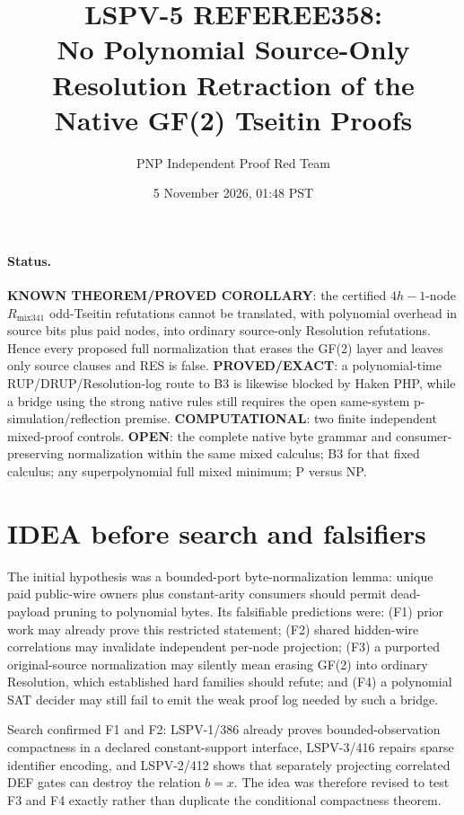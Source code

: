 \documentclass[11pt]{article}
\title{LSPV-5 REFEREE358:\\No Polynomial Source-Only Resolution Retraction of the Native GF(2) Tseitin Proofs}
\author{PNP Independent Proof Red Team}
\date{5 November 2026, 01:48 PST}
\begin{document}
\maketitle

\paragraph{Status.}
\textbf{KNOWN THEOREM/PROVED COROLLARY}: the certified $4h-1$-node $R_{\mathrm{mix341}}$ odd-Tseitin refutations cannot be translated, with polynomial overhead in source bits plus paid nodes, into ordinary source-only Resolution refutations.  Hence every proposed full normalization that erases the GF(2) layer and leaves only source clauses and RES is false.  \textbf{PROVED/EXACT}: a polynomial-time RUP/DRUP/Resolution-log route to B3 is likewise blocked by Haken PHP, while a bridge using the strong native rules still requires the open same-system p-simulation/reflection premise.  \textbf{COMPUTATIONAL}: two finite independent mixed-proof controls.  \textbf{OPEN}: the complete native byte grammar and consumer-preserving normalization within the same mixed calculus; B3 for that fixed calculus; any superpolynomial full mixed minimum; P versus NP.

\section{IDEA before search and falsifiers}

The initial hypothesis was a bounded-port byte-normalization lemma: unique paid public-wire owners plus constant-arity consumers should permit dead-payload pruning to polynomial bytes.  Its falsifiable predictions were: (F1) prior work may already prove this restricted statement; (F2) shared hidden-wire correlations may invalidate independent per-node projection; (F3) a purported original-source normalization may silently mean erasing GF(2) into ordinary Resolution, which established hard families should refute; and (F4) a polynomial SAT decider may still fail to emit the weak proof log needed by such a bridge.

Search confirmed F1 and F2: LSPV-1/386 already proves bounded-observation compactness in a declared constant-support interface, LSPV-3/416 repairs sparse identifier encoding, and LSPV-2/412 shows that separately projecting correlated DEF gates can destroy the relation $b=x$.  The idea was therefore revised to test F3 and F4 exactly rather than duplicate the conditional compactness theorem.
\end{document}
